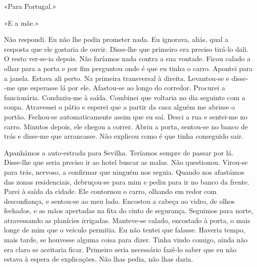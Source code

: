 «Para Portugal.»

«E a mãe.»

Não respondi. Eu não lhe podia prometer nada. Eu ignorava, aliás, qual a
resposta que ele gostaria de ouvir. Disse­‑lhe que primeiro era preciso
tirá­‑lo dali. O resto ver­‑se­‑ia depois. Não faríamos nada contra a
sua vontade. Ficou calado a olhar para a porta e por fim perguntou onde
é que eu tinha o carro. Apontei para a janela. Estava ali perto. Na
primeira transversal à direita. Levantou­‑se e disse­‑me que esperasse
lá por ele. Afastou­‑se ao longo do corredor. Procurei a funcionária.
Conduziu­‑me à saída. Combinei que voltaria no dia seguinte com a roupa.
Atravessei o pátio e esperei que a partir da casa alguém me abrisse o
portão. Fechou­‑se automaticamente assim que eu saí. Desci a rua e
sentei­‑me no carro. Minutos depois, ele chegou a correr. Abriu a porta,
sentou­‑se no banco de trás e disse­‑me que arrancasse. Não explicou
como é que tinha conseguido sair.

Apanhámos a auto­‑estrada para Sevilha. Teríamos sempre de passar por
lá. Disse­‑lhe que seria preciso ir ao hotel buscar as malas. Não
questionou. Virou­‑se para trás, nervoso, a confirmar que ninguém nos
seguia. Quando nos afastámos das zonas residenciais, debruçou­‑se para
mim e pediu para ir no banco da frente. Parei à saída da cidade. Ele
contornou o carro, olhando em redor com desconfiança, e sentou­‑se ao
meu lado. Encostou a cabeça ao vidro, de olhos fechados, e as mãos
apertadas na fita do cinto de segurança. Seguimos para norte,
atravessando as planícies irrigadas. Manteve­‑se calado, encostado à
porta, o mais longe de mim que o veículo permitia. Eu não tentei que
falasse. Haveria tempo, mais tarde, se houvesse alguma coisa para dizer.
Tinha vindo comigo, ainda não era claro se aceitaria ficar. Primeiro
seria necessário fazê­‑lo saber que eu não estava à espera de
explicações. Não lhas pedia, não lhas daria.

